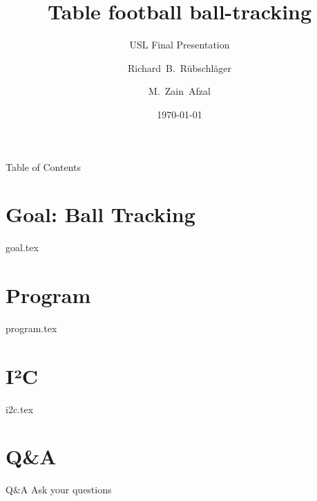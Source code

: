 \documentclass{beamer}
\begin{document}
    \begin{frame}
        \title[ball-tracking]{Table football ball-tracking}
        \subtitle{USL Final Presentation}
        \author[Rübschläger, Afzal]{Richard~B.~Rübschläger \and M.~Zain~Afzal}
        \date{\today}
        \maketitle
    \end{frame}

    \begin{frame}{Table of Contents}
        \tableofcontents
    \end{frame}

    \section{Goal: Ball Tracking}\label{section:goal}
    {goal.tex}

    \section{Program}\label{section:program}
    {program.tex}

    \section{I²C}\label{section:i2c}                                %
    {i2c.tex}

    
    \section{Q\&A}\label{section:qa}
    \begin{frame}{Q\&A}
        \centering\huge Ask your questions
    \end{frame}
    
\end{document}
